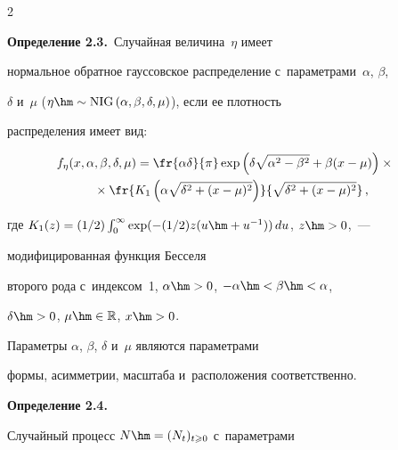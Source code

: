 \begin{multicols}{2}
\noindent


\textbf{Определение 2.3.}\  Случайная величина~$\eta$ имеет 


нормальное обратное гауссовское распределение с~параметрами~$\alpha$, $\beta$, 


$\delta$ и~$\mu$ ($\eta \hm\sim \mathrm{NIG}\,(\alpha, \beta, \delta, \mu)$), если ее плотность 


распределения имеет вид:


                \begin{multline*} 




                   \hspace*{-3mm}f_\eta(x, \alpha, \beta, \delta, \mu) = \fr{\alpha 


\delta}{\pi} \exp \left(\delta \sqrt{\alpha^2 - \beta^2} + \beta (x - \mu)\right) 


\times{}\\


{}\times \fr{K_1\left(\alpha \sqrt{\delta^2 + (x - \mu)^2}\right)}{\sqrt{\delta ^2 + (x - 


\mu)^2}}\,,


                \end{multline*}


                где $K_1(z) = (1/2) \int\nolimits_{0}^{\infty} \exp 


                (-({1}/{2}) z (u \hm+ u^{-1}))\,du$, $z\hm>0$,~--- 


                модифицированная функция Бесселя 


второго рода с~индексом~1, $\alpha \hm> 0$, $-\alpha \hm< \beta \hm< \alpha$, 


$\delta \hm> 0$,  $\mu \hm\in  \mathbb{R}$, $x\hm>0$.





                Параметры $\alpha$, $\beta$, $\delta$ и~$\mu$ являются параметрами 


формы, асимметрии, масштаба и~расположения соответственно. 





\smallskip





\noindent


\textbf{Определение 2.4.}\


                Случайный процесс $N \hm= (N_t)_{t \geqslant 0}$ с~параметрами 



\end{multicols}
